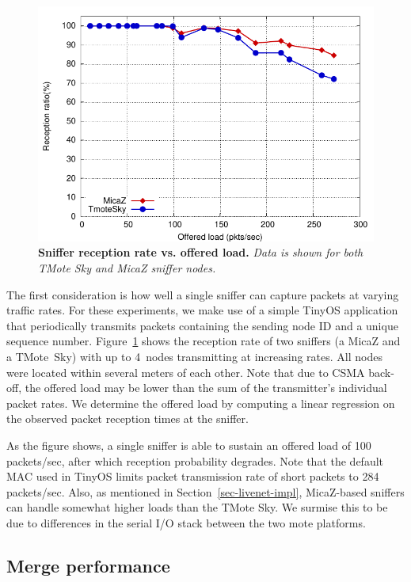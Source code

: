 \begin{figure}[t]
\begin{center}
\includegraphics[width=0.6\hsize]{./resources/livenet-sensys07/figs/validation/rate-test/rate-test.pdf}
\end{center}
\caption{\small {\bf Sniffer reception rate vs. offered load.} 
{\em Data is shown for both TMote Sky and MicaZ sniffer nodes.}}
\label{fig-sniffer-validation}
\end{figure}

The first consideration is how well a single sniffer can capture
packets at varying traffic rates.
For these experiments, we make use of a simple TinyOS application
that periodically transmits packets containing the sending node ID
and a unique sequence number.
Figure~\ref{fig-sniffer-validation} shows the reception rate of two
sniffers (a MicaZ and a TMote~Sky) with up to 4~nodes
transmitting at increasing rates. All nodes were located within
several meters of each other. 
Note that due to CSMA back-off, the offered load may be lower than the sum 
of the transmitter's individual packet rates. 
We determine the offered load by computing a linear regression on the 
observed packet reception times at the sniffer. 

As the figure shows, a single sniffer is able to sustain an offered
load of 100 packets/sec, after which reception probability degrades.
Note that the default MAC used in TinyOS limits packet transmission rate
of short packets to 284 packets/sec. 
Also, as mentioned in Section~\ref{sec-livenet-impl}, MicaZ-based sniffers
can handle somewhat higher loads than the TMote Sky. We surmise this
to be due to differences in the serial I/O stack between the two mote
platforms.



\subsection{Merge performance}


